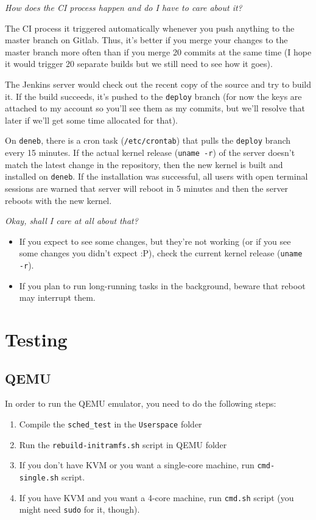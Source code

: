 \documentclass[]{report}
\begin{document}
\emph{How does the CI process happen and do I have to care about it?}

The CI process it triggered automatically whenever you push anything to
the master branch on Gitlab. Thus, it's better if you merge your changes
to the master branch more often than if you merge 20 commits at the same
time (I hope it would trigger 20 separate builds but we still need to
see how it goes).

The Jenkins server would check out the recent copy of the source and try
to build it. If the build succeeds, it's pushed to the
\lstinline!deploy! branch (for now the keys are attached to my account
so you'll see them as my commits, but we'll resolve that later if we'll
get some time allocated for that).

On \lstinline!deneb!, there is a cron task (\lstinline!/etc/crontab!)
that pulls the \lstinline!deploy! branch every 15 minutes. If the actual
kernel release (\lstinline!uname -r!) of the server doesn't match the
latest change in the repository, then the new kernel is built and
installed on \lstinline!deneb!. If the installation was successful, all
users with open terminal sessions are warned that server will reboot in
5 minutes and then the server reboots with the new kernel.

\emph{Okay, shall I care at all about that?}

\begin{itemize}
\itemsep1pt\parskip0pt
\item
  If you expect to see some changes, but they're not working (or if you
  see some changes you didn't expect :P), check the current kernel
  release (\lstinline!uname   -r!).
\item
  If you plan to run long-running tasks in the background, beware that
  reboot may interrupt them.
\end{itemize}

\section{Testing}\label{testing}

\subsection{QEMU}\label{qemu-1}

In order to run the QEMU emulator, you need to do the following steps:

\begin{enumerate}
\def\labelenumi{\arabic{enumi}.}
\itemsep1pt\parskip0pt
\item
  Compile the \lstinline!sched_test! in the \lstinline!Userspace! folder
\item
  Run the \lstinline!rebuild-initramfs.sh! script in QEMU folder
\item
  If you don't have KVM or you want a single-core machine, run
  \lstinline!cmd- single.sh! script.
\item
  If you have KVM and you want a 4-core machine, run \lstinline!cmd.sh!
  script (you might need \lstinline!sudo! for it, though).
\end{enumerate}
\end{document}
